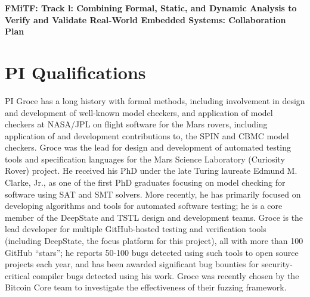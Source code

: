 \documentclass[12pt]{article}
\begin{document}

\begin{center}
{\large\sf\bfseries FMiTF: Track l: Combining Formal, Static, and
  Dynamic Analysis to Verify and Validate Real-World Embedded Systems: Collaboration Plan}
\end{center}

\section{PI Qualifications}

PI Groce has a long history with formal methods, including involvement in design and development of well-known model checkers, and application of model checkers at NASA/JPL on flight software for the Mars rovers, including application of and development contributions to, the SPIN and CBMC model checkers.  Groce was the lead for design and development of automated testing tools and specification languages for the Mars Science Laboratory (Curiosity Rover) project.  He received his PhD under the late Turing laureate Edmund M. Clarke, Jr., as one of the first PhD graduates focusing on model checking for software using SAT and SMT solvers.  More recently, he has primarily focused on developing algorithms and tools for automated software testing; he is a core member of the DeepState and TSTL design and development teams.  Groce is the lead developer for multiple GitHub-hosted testing and verification tools (including DeepState, the focus platform for this project), all with more than 100 GitHub ``stars''; he reports 50-100 bugs detected using such tools to open source projects each year, and has been awarded significant bug bounties for security-critical compiler bugs detected using his work.  Groce was recently chosen by the Bitcoin Core team to investigate the effectiveness of their fuzzing framework.
\end{document}
